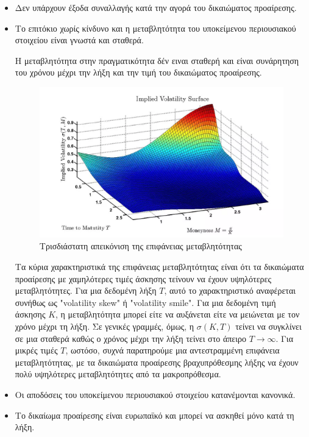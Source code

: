 \begin{itemize}
    \item Δεν υπάρχουν έξοδα συναλλαγής κατά την αγορά του δικαιώματος προαίρεσης.
    \item Το επιτόκιο χωρίς κίνδυνο και η μεταβλητότητα του υποκείμενου περιουσιακού στοιχείου είναι γνωστά και σταθερά.
    \begin{tcolorbox}[colframe=blue!50!black, colback=blue!5, title=Ορισμός Προαιρεσης Μετοχών]
        Η μεταβλητότητα στην πραγματικότητα δέν ειναι σταθερή και είναι συνάρητηση του χρόνου μέχρι την λήξη και την τιμή  του δικαιώματος προαίρεσης.
        \begin{figure}[H]
          \centering
          \includegraphics[width=1.0\textwidth]{./figures/chapter2/volatility_surface.png}
          \caption{Τρισδιάστατη απεικόνιση της επιφάνειας μεταβλητότητας}
          \label{fig:volatility_surface}
        \end{figure}
        Τα κύρια χαρακτηριστικά της επιφάνειας μεταβλητότητας είναι ότι τα δικαιώματα προαίρεσης με χαμηλότερες τιμές άσκησης τείνουν 
        να έχουν υψηλότερες μεταβλητότητες. Για μια δεδομένη λήξη $T$, αυτό το χαρακτηριστικό αναφέρεται συνήθως ως "volatility skew" ή "volatility smile".
        Για μια δεδομένη τιμή άσκησης $K$, η μεταβλητότητα μπορεί είτε να αυξάνεται είτε να μειώνεται με τον χρόνο μέχρι τη λήξη.
        Σε γενικές γραμμές, όμως, η $\sigma(K, T)$ τείνει να συγκλίνει σε μια σταθερά καθώς ο χρόνος μέχρι την λήξη τείνει στο άπειρο $T \to \infty$. 
        Για μικρές τιμές $T$, ωστόσο, συχνά παρατηρούμε μια αντεστραμμένη επιφάνεια μεταβλητότητας, με τα δικαιώματα προαίρεσης βραχυπρόθεσμης 
        λήξης να έχουν πολύ υψηλότερες μεταβλητότητες από τα μακροπρόθεσμα.
    \end{tcolorbox}
    \item Οι αποδόσεις του υποκείμενου περιουσιακού στοιχείου κατανέμονται κανονικά.
    \item Το δικαίωμα προαίρεσης είναι ευρωπαϊκό και μπορεί να ασκηθεί μόνο κατά τη λήξη.
\end{itemize}

